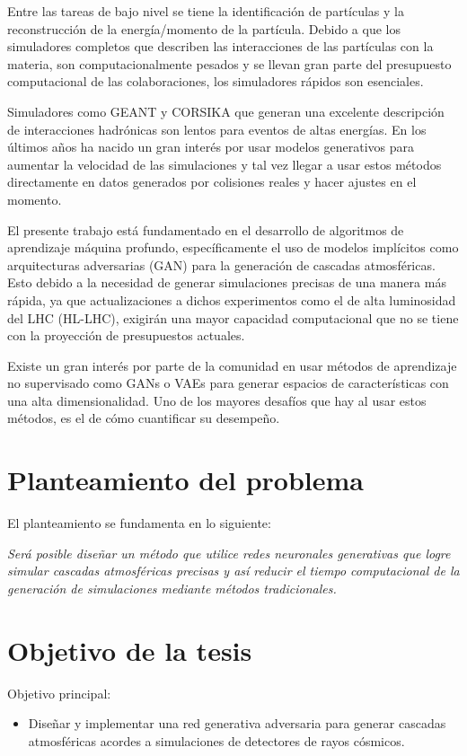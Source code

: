 Entre las tareas de bajo nivel se tiene la identificación de partículas y la reconstrucción de la energía/momento de la partícula. Debido a que los simuladores completos que describen las interacciones de las partículas con la materia, son computacionalmente pesados y se llevan gran parte del presupuesto computacional de las colaboraciones, los simuladores rápidos son esenciales.

Simuladores como GEANT y CORSIKA que generan una excelente descripción de interacciones hadrónicas son lentos para eventos de altas energías.
En los últimos años ha nacido un gran interés por usar modelos generativos para aumentar la velocidad de las simulaciones y tal vez llegar a usar estos métodos directamente en datos generados por colisiones reales y hacer ajustes en el momento.

El presente trabajo está fundamentado en el desarrollo de algoritmos de aprendizaje máquina profundo, específicamente el uso de modelos implícitos como arquitecturas adversarias (GAN) para la generación de cascadas atmosféricas. Esto debido a la necesidad de generar simulaciones precisas de una manera más rápida, ya que actualizaciones a dichos experimentos como el de alta luminosidad del LHC (HL-LHC), exigirán una mayor capacidad computacional que no se tiene con la proyección de presupuestos actuales.

Existe un gran interés por parte de la comunidad en usar métodos de aprendizaje no supervisado como GANs o VAEs para generar espacios de características con una alta dimensionalidad. Uno de los mayores desafíos que hay al usar estos métodos, es el de cómo cuantificar su desempeño.

\section{Planteamiento del problema}

El planteamiento se fundamenta en lo siguiente:

\emph{Será posible diseñar un método que utilice redes neuronales generativas que logre simular cascadas atmosféricas precisas y así reducir el tiempo computacional de la generación de simulaciones mediante métodos tradicionales.}


\section{Objetivo de la tesis}
Objetivo principal:
\begin{itemize}
   \item Diseñar y implementar una red generativa adversaria para generar cascadas atmosféricas acordes a simulaciones de detectores de rayos cósmicos.
\end{itemize}

